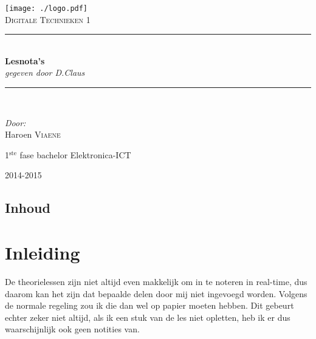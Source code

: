 \documentclass[11pt, a4paper]{report}
\newcommand{\HRule}{\rule{\linewidth}{0.5mm}}
\begin{document}
\begin{titlepage}
\begin{center}
\texttt{[image: ./logo.pdf]}~\\[1cm]


\textsc{\Large Digitale Technieken 1}\\[0.5cm]

\HRule \\[0.4cm]
{ \LARGE \bfseries Lesnota's}\\[0.4cm]
{\large \textit{gegeven door D.Claus}}\\[0.2cm]

\HRule \\[1.5cm]

\begin{minipage}{0.4\textwidth}
\begin{flushleft} \large
\emph{Door: }\\
Haroen \textsc{Viaene}\\

\end{flushleft}
\end{minipage}
\begin{minipage}{0.4\textwidth}
\begin{flushright} \large
\large{1$^{\text{ste}}$ fase bachelor Elektronica-ICT}\\
\end{flushright}
\end{minipage}

\vfill

{\large 2014-2015}

\end{center}
\end{titlepage}

\newpage

\section*{Inhoud}

\tableofcontents

\newpage

\chapter{Inleiding}

De theorielessen zijn niet altijd even makkelijk om in te noteren in real-time, dus daarom kan het zijn dat bepaalde delen door mij niet ingevoegd worden. Volgens de normale regeling zou ik die dan wel op papier moeten hebben. Dit gebeurt echter zeker niet altijd, als ik een stuk van de les niet opletten, heb ik er dus waarschijnlijk ook geen notities van.
\end{document}
